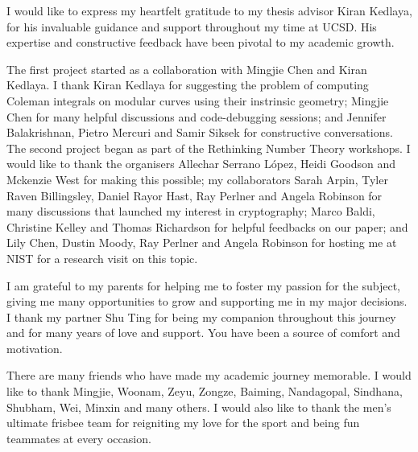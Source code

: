 \begin{frontmatter}
%
\tableofcontents



%
%
\begin{acknowledgements}
I would like to express my heartfelt gratitude to my thesis advisor Kiran Kedlaya, for his invaluable guidance and support throughout my time at UCSD. His expertise and constructive feedback have been pivotal to my academic growth.

The first project started as a collaboration with Mingjie Chen and Kiran Kedlaya. I thank Kiran Kedlaya for suggesting the problem of computing Coleman integrals on modular curves using their instrinsic geometry; Mingjie Chen for many helpful discussions and code-debugging sessions; and Jennifer Balakrishnan, Pietro Mercuri and Samir Siksek for constructive conversations. The second project began as part of the Rethinking Number Theory workshops. I would like to thank the organisers Allechar Serrano López, Heidi Goodson and Mckenzie West for making this possible; my collaborators Sarah Arpin, Tyler Raven Billingsley, Daniel Rayor Hast, Ray Perlner and Angela Robinson for many discussions that launched my interest in cryptography; Marco Baldi, Christine Kelley and Thomas Richardson for helpful feedbacks on our paper; and Lily Chen, Dustin Moody, Ray Perlner and Angela Robinson for hosting me at NIST for a research visit on this topic.

I am grateful to my parents for helping me to foster my passion for the subject, giving me many opportunities to grow and supporting me in my major decisions. I thank my partner Shu Ting for being my companion throughout this journey and for many years of love and support. You have been a source of comfort and motivation.

There are many friends who have made my academic journey memorable. I would like to thank Mingjie, Woonam, Zeyu, Zongze, Baiming, Nandagopal, Sindhana, Shubham, Wei, Minxin and many others. I would also like to thank the men's ultimate frisbee team for reigniting my love for the sport and being fun teammates at every occasion.


\end{acknowledgements}
\end{frontmatter}
